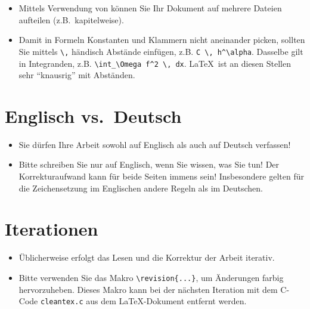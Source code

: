 \documentclass[a4paper,11pt,bibliography=totoc,listof=totoc,headinclude=true,cleardoublepage=empty,oneside]{scrbook}
\def\revision#1{{\color{uhh_red}#1}}
\begin{document}
{\begin{itemize}
\item Mittels Verwendung von \verb$$ können Sie Ihr Dokument auf mehrere Dateien aufteilen (z.B.\ kapitelweise).

\item Damit in Formeln Konstanten und Klammern nicht aneinander picken, sollten Sie mittels \verb$\,$ händisch Abstände einfügen, z.B. \verb$C \, h^\alpha$. Dasselbe gilt in Integranden, z.B. \verb$\int_\Omega f^2 \, dx$. \LaTeX\ ist an diesen Stellen sehr "`knausrig"' mit Abständen.
\end{itemize}
}

\section{Englisch vs.\ Deutsch}

{\color{change}
\begin{itemize}

\item Sie dürfen Ihre Arbeit sowohl auf Englisch als auch auf Deutsch verfassen!

\item Bitte schreiben Sie nur auf Englisch, wenn Sie wissen, was Sie tun! Der Korrekturaufwand kann für beide Seiten immens sein! Insbesondere gelten für die Zeichensetzung im Englischen andere Regeln als im Deutschen.

\end{itemize}
}

\section{Iterationen}

{\color{change}
\begin{itemize}

\item Üblicherweise erfolgt das Lesen und die Korrektur der Arbeit iterativ.
\item Bitte verwenden Sie das Makro \verb$\revision{...}$, um Änderungen \revision{farbig hervorzuheben}. Dieses Makro kann bei der nächsten Iteration mit dem C-Code \verb$cleantex.c$ aus dem \LaTeX-Dokument entfernt werden.

\end{itemize}
}
\end{document}
